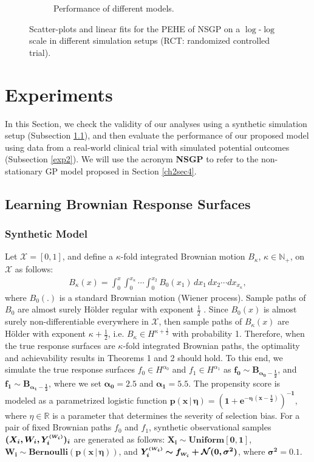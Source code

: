 \documentclass [PhD] {uclathes}
\begin{document}
\begin{figure}[t]
\begin{subfigure}{.33\textwidth}
  \caption{\footnotesize Performance of different models.}
  \label{Ahmed3}
\end{subfigure}
	\caption{Scatter-plots and linear fits for the PEHE of NSGP on a $\log$-$\log$ scale in different simulation setups {(RCT: randomized controlled trial)}.}
	\label{ch2Fig2}
\end{figure}

\section{Experiments}
In this Section, we check the validity of our analyses using a synthetic simulation setup (Subsection \ref{exp1}), and then evaluate the performance of our proposed model using data from a real-world clinical trial with simulated potential outcomes (Subsection \ref{exp2}). We will use the acronym \textbf{NSGP} to refer to the non-stationary GP model proposed in Section \ref{ch2sec4}.  
\subsection{Learning Brownian Response Surfaces}
\label{exp1}
\subsubsection{Synthetic Model}
\label{expexp0}
Let $\mathcal{X} = [0,1]$, and define a $\kappa$-fold integrated Brownian motion $B_{\kappa}$, $\kappa \in \mathbb{N}_+$, on $\mathcal{X}$ as follows:
\begin{align} 
B_{\kappa}(x) = \int_{0}^{x}\int_{0}^{x_\kappa} \cdots \int_{0}^{x_2} B_0(x_1) \,dx_1\, dx_2 \cdots dx_{x_\kappa}, \nonumber 
\end{align}
where $B_0(.)$ is a standard Brownian motion (Wiener process). Sample paths of $B_0$ are almost surely H\"older regular with exponent $\frac{1}{2}$ \cite{karatzas2012brownian}. Since $B_0(x)$ is almost surely non-differentiable everywhere in $\mathcal{X}$, then sample paths of $B_{\kappa}(x)$ are H\"older with exponent $\kappa + \frac{1}{2}$, i.e. $B_{\kappa} \in H^{\kappa+\frac{1}{2}}$ with probability 1. Therefore, when the true response surfaces are $\kappa$-fold integrated Brownian paths, the optimality and achievability results in Theorems 1 and 2 should hold. To this end, we simulate the true response surfaces $f_0 \in H^{\alpha_0}$ and $f_1 \in H^{\alpha_1}$ as $\boldsymbol{f_0 \sim B_{\alpha_0-\frac{1}{2}}}$, and $\boldsymbol{f_1 \sim B_{\alpha_1-\frac{1}{2}}}$, where we set $\boldsymbol{\alpha_0 = 2.5}$ and $\boldsymbol{\alpha_1 = 5.5}$. The propensity score is modeled as a parametrized logistic function $\boldsymbol{p(x\,|\,\eta) = (1+e^{-\eta\,(x-\frac{1}{2})})^{-1}}$, where $\eta \in \mathbb{R}$ is a parameter that determines the severity of selection bias. For a pair of fixed Brownian paths $f_0$ and $f_1$, synthetic observational samples $\boldsymbol{(X_i,W_i,Y^{\mbox{\tiny $(W_i)$}}_i)_i}$ are generated as follows: $\boldsymbol{X_i \sim \mbox{Uniform}[0,1]}$, $\boldsymbol{W_i \sim \mbox{Bernoulli}(p(x\,|\,\eta))}$, and $\boldsymbol{Y^{\mbox{\tiny $(W_i)$}}_i \sim f_{\mbox{\tiny $W_i$}} + \mathcal{N}(0,\sigma^2)}$, where $\boldsymbol{\sigma^2 = 0.1}$. 
\end{document}
